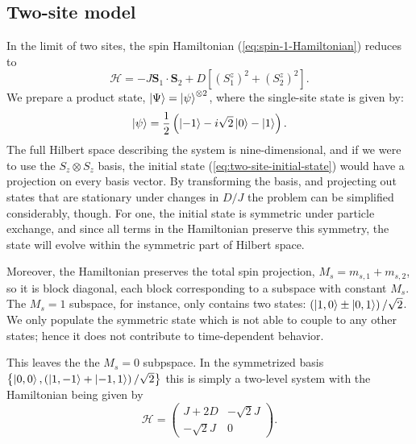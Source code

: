 \documentclass[aps,prl,twocolumn,superscriptaddress]{revtex4-1}
\newcounter{comment}
\newcommand{\comment}[2][]{\todo[color=red!100!green!33, #1]{#2}}
\begin{document}
\subsection*{Two-site model}%
In the limit of two sites, the spin Hamiltonian (\ref{eq:spin-1-Hamiltonian}) reduces to
\begin{equation}
    \mathcal{H} = -J \mathbf{S}_1\cdot\mathbf{S}_2 + D\left[ \left( S_1^z \right)^2 + \left( S_2^z \right)^2 \right].
\end{equation}
We prepare a product state, $\ket{\Psi} = \ket{\psi}^{\otimes 2}$, where the single-site state is given by:
\begin{equation}\label{eq:two-site-initial-state}
    \ket{\psi} = \frac{1}{2} \left( \ket{-1} - i\sqrt{2} \ket{0} - \ket{1} \right).
\end{equation}
The full Hilbert space describing the system is nine-dimensional, and if we were to use the $S_z \otimes S_z$ basis, the initial state (\ref{eq:two-site-initial-state}) would have a projection on every basis vector. By transforming the basis, and projecting out states that are stationary under changes in $D/J$ the problem can be simplified considerably, though. For one, the initial state is symmetric under particle exchange, and since all terms in the Hamiltonian preserve this symmetry, the state will evolve within the symmetric part of Hilbert space. 

Moreover, the Hamiltonian preserves the total spin projection, $M_s = m_{s,1} + m_{s,2}$, so it is block diagonal, each block corresponding to a subspace with constant $M_s$. The $M_s = 1$ subspace, for instance, only contains two states: $\left( \ket{1, 0} \pm \ket{0, 1} \right)/\sqrt{2}$. We only populate the symmetric state which is not able to couple to any other states; hence it does not contribute to time-dependent behavior.

This leaves the the $M_s = 0$ subpspace. In the symmetrized basis $\left\{ \ket{0, 0}, \left( \ket{1, -1} + \ket{-1, 1} \right)/\sqrt{2} \right\}$ this is simply a two-level system with the Hamiltonian being given by
\begin{equation}\label{eq:transformed-two-site-hamiltonian}
    \mathcal{H} = \begin{pmatrix}
    J + 2D & -\sqrt{2} J \\
    -\sqrt{2} J & 0
    \end{pmatrix}.
 \end{equation}
\end{document}
